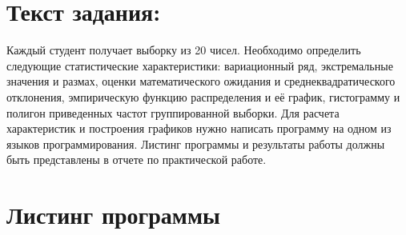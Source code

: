 \documentclass[12pt,one column]{article}
\begin{document}

\newpage
\tableofcontents
\newpage
\section{Текст задания:}
Каждый студент получает выборку из 20 чисел. Необходимо определить следующие статистические характеристики: вариационный ряд, экстремальные значения и размах, оценки математического ожидания и среднеквадратического отклонения, эмпирическую функцию распределения и её график, гистограмму и полигон приведенных частот группированной выборки. Для расчета характеристик и построения графиков нужно написать программу на одном из языков программирования. Листинг программы и результаты работы должны быть представлены в отчете по практической работе.

\section{Листинг программы}

\end{document}
